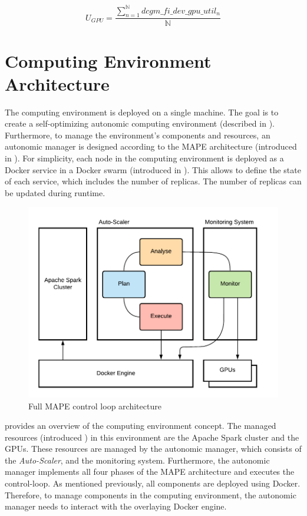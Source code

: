 \begin{equation}
U_{GPU} = \dfrac{\sum_{n=1}^{\mathbb{N}}dcgm\_fi\_dev\_gpu\_util_{n}}{\mathbb{N}}
\label{eq:05_metrics_gpu}
\end{equation}


\section{Computing Environment Architecture}
The computing environment is deployed on a single machine.
The goal is to create a self-optimizing autonomic computing environment (described in ).
Furthermore, to manage the environment's components and resources, an autonomic manager is designed according to the MAPE architecture (introduced in ).
For simplicity, each node in the computing environment is deployed as a Docker service in a Docker swarm (introduced in ).
This allows to define the state of each service, which includes the number of replicas. The number of replicas can be updated during runtime.


\begin{figure}[h]
\centering
\includegraphics[scale=1]{images/05_conceptual_design/autonomic_manager/control_loop}
\caption{Full MAPE control loop architecture}
\label{fig:05_am_monitoring_loop_arch}
\end{figure}
 provides an overview of the computing environment concept.
The managed resources (introduced ) in this environment are the Apache Spark cluster and the GPUs.
These resources are managed by the autonomic manager, which consists of the \textit{Auto-Scaler}, and the monitoring system. Furthermore, the autonomic manager implements all four phases of the MAPE architecture and executes the control-loop.
As mentioned previously, all components are deployed using Docker. Therefore, to manage components in the computing environment, the autonomic manager needs to interact with the overlaying Docker engine.


